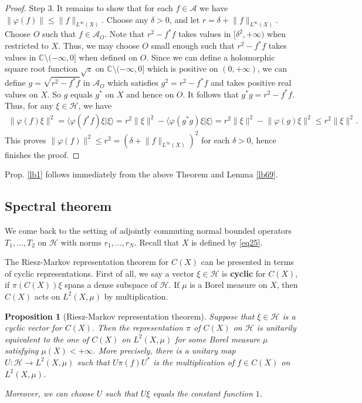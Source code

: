 \documentclass[12pt,b5paper,notitlepage]{article}
\theoremstyle{definition}
\theoremstyle{plain}
\newtheorem{pp}[df]{Proposition}
\newcommand{\mc}{\mathcal}
\newcommand{\bk}[1]{\langle {#1}\rangle}
\newcommand{\Cbb}{\mathbb C}
\numberwithin{equation}{section}
\begin{document}
\begin{proof}
Step 3. It remains to show that for each $ f\in\mc A$ we have $\lVert\varphi( f)\lVert\leq \lVert  f\lVert_{L^\infty(X)}$. Choose any $\delta>0$, and let $r=\delta+\lVert  f\lVert_{L^\infty(X)}$. Choose $O$ such that $ f\in\mc A_O$. Note that $r^2- f^* f$ takes values in $[\delta^2,+\infty)$ when restricted to $X$. Thus, we may choose $O$ small enough such that $r^2- f^* f$ takes values in $\Cbb\setminus(-\infty,0]$ when defined on $O$. Since we can define a holomorphic square root function $\sqrt z$ on $\Cbb\setminus(-\infty,0]$ which is positive on $(0,+\infty)$, we can define $ g=\sqrt{r^2- f^* f}$  in $\mc A_O$ which satisfies $ g^2=r^2- f^* f$ and takes positive real values on $X$. So $ g$ equals $ g^*$ on $X$ and hence on $O$. It follows that $ g^* g=r^2- f^* f$. Thus, for any $\xi\in\mc H$, we have
\begin{align*}
\lVert \varphi( f)\xi\lVert^2=\bk{\varphi( f^* f)\xi|\xi}=r^2\lVert\xi\lVert^2-\bk{\varphi( g^* g)\xi|\xi}	=r^2\lVert\xi\lVert^2-\lVert \varphi( g)\xi\lVert^2\leq r^2\lVert\xi\lVert^2.
\end{align*}
This proves $\lVert\varphi( f)\lVert^2\leq r^2=(\delta+\lVert f\lVert_{L^\infty(X)})^2$ for each $\delta>0$, hence finishes the proof.
\end{proof}

Prop.  \ref{lb1} follows immediately from the above Theorem and Lemma \ref{lb69}.


\subsection*{Spectral theorem}

We come back to the setting of adjointly commuting normal bounded operators $T_1,\dots,T_2$ on $\mc H$ with norms $r_1,\dots,r_N$. Recall that $X$ is defined by \eqref{eq25}.

The Riesz-Markov representation theorem for $C(X)$ can be presented in terms of cyclic representations. First of all, we say a vector $\xi\in\mc H$ is \textbf{cyclic} for $C(X)$, if $\pi(C(X))\xi$ spans a dense subspace of $\mc H$. If $\mu$ is a Borel measure on $X$, then $C(X)$ acts on $L^2(X,\mu)$ by multiplication.

\begin{pp}[Riesz-Markov representation theorem]\label{lb7}
Suppose that $\xi\in\mc H$ is a cyclic vector for $C(X)$. Then the representation $\pi$ of $C(X)$ on $\mc H$ is unitarily equivalent to the one of $C(X)$ on $L^2(X,\mu)$ for some Borel measure $\mu$ satisfying $\mu(X)<+\infty$. More precisely, there is a unitary map $U:\mc H\rightarrow L^2(X,\mu)$ such that $U\pi(f)U^*$ is the multiplication of $f\in C(X)$ on $L^2(X,\mu)$.

Moreover, we can choose $U$ such that $U\xi$ equals the constant function $1$.
\end{pp}
\end{document}
